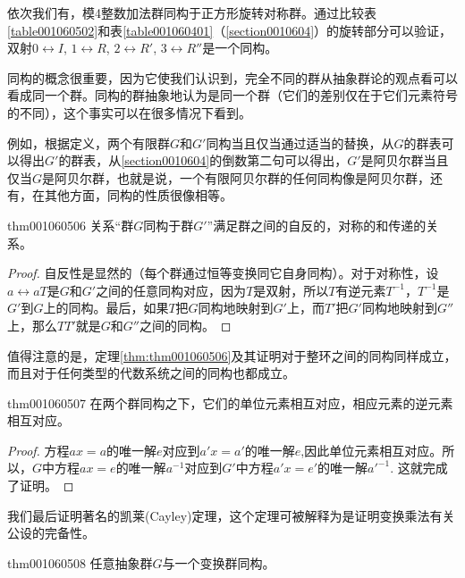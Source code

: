 依次我们有，模4整数加法群同构于正方形旋转对称群。通过比较表\ref{table001060502}和表\ref{table001060401}（\ref{section0010604}）的旋转部分可以验证，双射$0 \leftrightarrow I$, $1 \leftrightarrow R$, $2 \leftrightarrow R'$, $3 \leftrightarrow R''$是一个同构。

同构的概念很重要，因为它使我们认识到，完全不同的群从抽象群论的观点看可以看成同一个群。同构的群抽象地认为是同一个群（它们的差别仅在于它们元素符号的不同），这个事实可以在很多情况下看到。

例如，根据定义，两个有限群$G$和$G'$同构当且仅当通过适当的替换，从$G$的群表可以得出$G'$的群表，从\ref{section0010604}的倒数第二句可以得出，$G'$是阿贝尔群当且仅当$G$是阿贝尔群，也就是说，一个有限阿贝尔群的任何同构像是阿贝尔群，还有，在其他方面，同构的性质很像相等。

\begin{theorem}{}{thm001060506}
关系“群$G$同构于群$G'$”满足群之间的自反的，对称的和传递的关系。
\end{theorem}

\begin{proof}
自反性是显然的（每个群通过恒等变换同它自身同构）。对于对称性，设$a \leftrightarrow aT$是$G$和$G'$之间的任意同构对应，因为$T$是双射，所以$T$有逆元素$T^{-1}$，$T^{-1}$是$G'$到$G$上的同构。最后，如果$T$把$G$同构地映射到$G'$上，而$T'$把$G'$同构地映射到$G''$上，那么$TT'$就是$G$和$G''$之间的同构。
\end{proof}

值得注意的是，定理\ref{thm:thm001060506}及其证明对于整环之间的同构同样成立，而且对于任何类型的代数系统之间的同构也都成立。

\begin{theorem}{}{thm001060507}
在两个群同构之下，它们的单位元素相互对应，相应元素的逆元素相互对应。
\end{theorem}

\begin{proof}
方程$ax=a$的唯一解$e$对应到$a'x=a'$的唯一解$e$,因此单位元素相互对应。所以，$G$中方程$ax=e$的唯一解$a^{-1}$对应到$G'$中方程$a'x=e'$的唯一解$a'^{-1}$. 这就完成了证明。
\end{proof}

我们最后证明著名的凯莱(Cayley)定理，这个定理可被解释为是证明变换乘法有关公设的完备性。

\begin{theorem}{}{thm001060508}
任意抽象群$G$与一个变换群同构。
\end{theorem}

